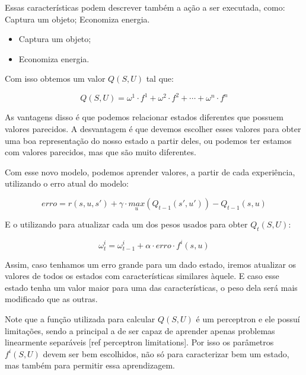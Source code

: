 Essas características podem descrever também a ação a ser executada, como:
Captura um objeto;
Economiza energia.

\begin{itemize}
	\item Captura um objeto;
	\item Economiza energia.
\end{itemize}

Com isso obtemos um valor $ Q \left( S, U \right) $ tal que:

\begin{equation}
	Q \left( S, U \right) = \omega^1 \cdot f^1 + \omega^2 \cdot f^2 + \cdots + \omega^n \cdot f^n
\end{equation}

As vantagens disso é que podemos relacionar estados diferentes que possuem valores parecidos. A desvantagem é que devemos escolher esses valores para obter uma boa representação do nosso estado a partir deles, ou podemos ter estamos com valores parecidos, mas que são muito diferentes.

Com esse novo modelo, podemos aprender valores, a partir de cada experiência, utilizando o erro atual do modelo:

\begin{equation}
	erro = r \left( s, u, s' \right) + \gamma \cdot \underset{u}{max} \left( Q_{t-1} \left( s', u' \right) \right) - Q_{t-1} \left( s, u \right)
\end{equation}

E o utilizando para atualizar cada um dos pesos usados para obter $ Q_t \left( S, U \right) $:

\begin{equation}
	\omega_t^i = \omega_{t-1}^i + \alpha \cdot erro \cdot f^i \left( s, u \right)
\end{equation}

Assim, caso tenhamos um erro grande para um dado estado, iremos atualizar os valores de todos os estados com características similares àquele. E caso esse estado tenha um valor maior para uma das características, o peso dela será mais modificado que as outras.

Note que a função utilizada para calcular $ Q \left( S, U \right) $ é um perceptron e ele possuí limitações, sendo a principal a de ser capaz de aprender apenas problemas linearmente separáveis [ref perceptron limitations]. Por isso os parâmetros $ f^i \left( S, U \right) $ devem ser bem escolhidos, não só para caracterizar bem um estado, mas também para permitir essa aprendizagem.



